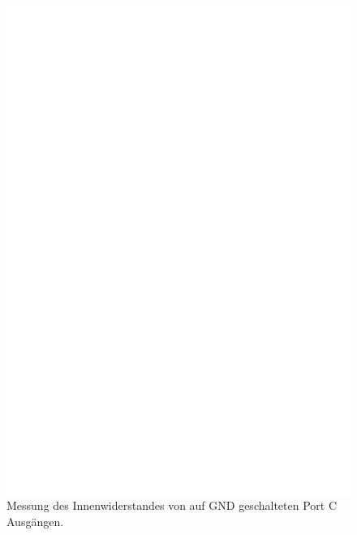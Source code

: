 \begin{enumerate}
\begin{figure}[H]
\includegraphics[]{../FIG/Test7.eps}
\caption{Messung des Innenwiderstandes von auf GND geschalteten Port C Ausg\"angen.}
\label{fig:test7}
\end{figure}


\end{enumerate}

